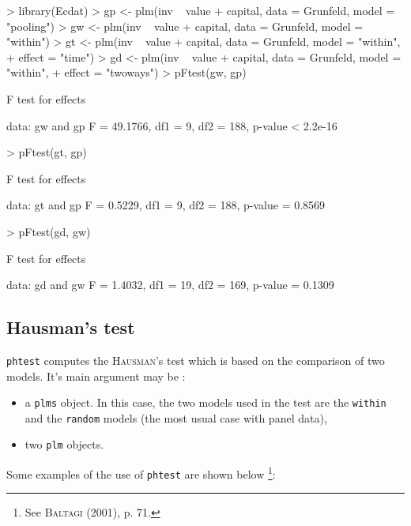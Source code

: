 \documentclass[a4paper]{article}
\begin{document}
\begin{Schunk}
\begin{Sinput}
> library(Ecdat)
> gp <- plm(inv ~ value + capital, data = Grunfeld, model = "pooling")
> gw <- plm(inv ~ value + capital, data = Grunfeld, model = "within")
> gt <- plm(inv ~ value + capital, data = Grunfeld, model = "within", 
+     effect = "time")
> gd <- plm(inv ~ value + capital, data = Grunfeld, model = "within", 
+     effect = "twoways")
> pFtest(gw, gp)
\end{Sinput}
\begin{Soutput}
	F test for effects

data:  gw and gp 
F = 49.1766, df1 = 9, df2 = 188, p-value < 2.2e-16
\end{Soutput}
\begin{Sinput}
> pFtest(gt, gp)
\end{Sinput}
\begin{Soutput}
	F test for effects

data:  gt and gp 
F = 0.5229, df1 = 9, df2 = 188, p-value = 0.8569
\end{Soutput}
\begin{Sinput}
> pFtest(gd, gw)
\end{Sinput}
\begin{Soutput}
	F test for effects

data:  gd and gw 
F = 1.4032, df1 = 19, df2 = 169, p-value = 0.1309
\end{Soutput}
\end{Schunk}



\subsection{Hausman's test}

\texttt{phtest} computes the \textsc{Hausman}'s test which is based on
the  comparison of two models. It's main argument may be :

\begin{itemize}
\item a \texttt{plms} object. In this case, the two models used in the
  test are the \texttt{within} and the \texttt{random} models (the
  most usual case with panel data),
\item two \texttt{plm} objects.
\end{itemize}


Some examples of the use of \texttt{phtest} are shown below
\footnote{See \textsc{Baltagi} (2001), p. 71.}:
\end{document}
